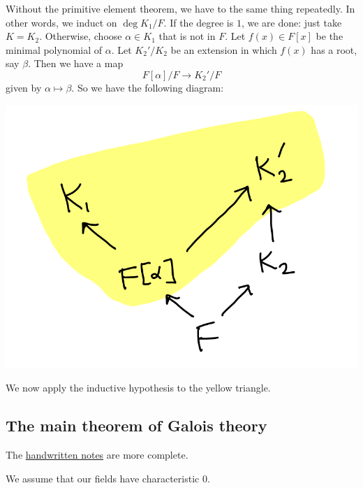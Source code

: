 \documentclass[11pt]{article}
\begin{document}
\begin{enumerate}
Without the primitive element theorem, we have to the same thing repeatedly.
In other words, we induct on \(\deg K_1/F\).
If the degree is \(1\), we are done: just take \(K = K_2\).
Otherwise, choose \(\alpha \in K_{1}\) that is not in \(F\).
Let \(f(x) \in F[x]\) be the minimal polynomial of \(\alpha\).
Let \(K_2'/K_2\) be an extension in which \(f(x)\) has a root, say \(\beta\).
Then we have a map
\[ F[\alpha]/F \to K_{2}'/F\]
given by \(\alpha \mapsto \beta\).
So we have the following diagram:

\begin{center}
\includegraphics[width=.9\linewidth]{assets/Course_notes/2023-04-24_11-54-21_screenshot.png}
\end{center}
We now apply the inductive hypothesis to the yellow triangle.
\end{enumerate}
\subsection{The main theorem of Galois theory}
\label{sec:org4be92fd}
The \href{assets/Course\_notes/2023-05-02-Note-14-56.pdf}{handwritten notes} are more complete.

We assume that our fields have characteristic 0.
\end{document}
